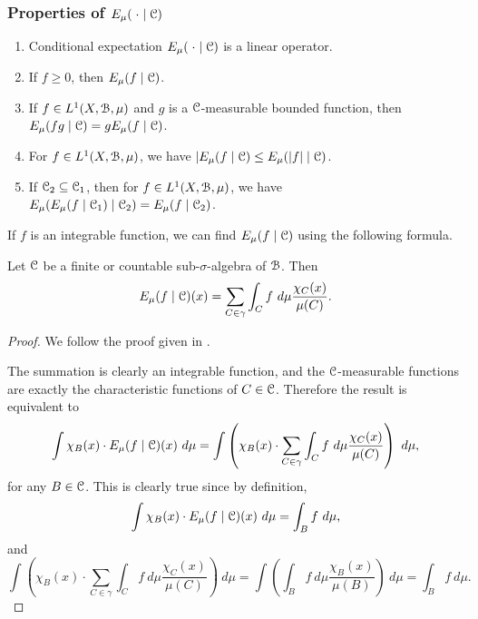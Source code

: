 \subsubsection{Properties of \texorpdfstring{$E_\mu(\mathrel{}\cdot\mathrel{} \mid \mathcal{C})$}{the conditional expectation operator}}
\begin{enumerate}
	\item Conditional expectation $E_\mu(\mathrel{}\cdot\mathrel{} \mid \mathcal{C})$ is a linear operator. \label{cond-exp:1}
	\item If $f \geq 0$, then $E_\mu(f \mid \mathcal{C})$. \label{cond-exp:2}
	\item If $f \in L^1(X, \mathcal{B}, \mu)$ and $g$ is a $\mathcal{C}$-measurable bounded function, then $E_\mu(fg \mid \mathcal{C}) = gE_\mu(f \mid \mathcal{C})$. \label{cond-exp:3}
	\item For $f \in L^1(X, \mathcal{B}, \mu)$, we have $|E_\mu(f \mid \mathcal{C}) \leq E_\mu(|f| \mid \mathcal{C})$. \label{cond-exp:4}
	\item If $\mathcal{C}_2 \subseteq \mathcal{C}_1$, then for $f \in L^1(X, \mathcal{B}, \mu)$, we have $E_\mu(E_\mu(f \mid \mathcal{C}_1) \mid \mathcal{C}_2) = E_\mu(f \mid \mathcal{C}_2)$. \label{cond-exp:5}
\end{enumerate}

If $f$ is an integrable function, we can find $E_\mu(f \mid \mathcal{C})$ using the following formula.

\begin{proposition}
	Let $\mathcal{C}$ be a finite or countable sub-$\sigma$-algebra of $\mathcal{B}$. Then
	\[
		E_\mu(f \mid \mathcal{C})(x) = \sum_{C \in \gamma}{\int_{C}{f\ d\mu}\frac{\chi_{C}(x)}{\mu(C)}}.
	\]
	
	\begin{proof}
		We follow the proof given in \cite[Example 10.1.2]{bogachev:measure}.
		
		The summation is clearly an integrable function, and the $\mathcal{C}$-measurable functions are exactly the characteristic functions of $C \in \mathcal{C}$. Therefore the result is equivalent to
		\[
			\int{\chi_B(x) \cdot E_\mu(f \mid \C)(x)\ d\mu} = \int{\left(\chi_B(x) \cdot \sum_{C \in \gamma}{\int_{C}{f\ d\mu}\frac{\chi_{C}(x)}{\mu(C)}}\right)\ d\mu},
		\]
		for any $B \in \mathcal{C}$. This is clearly true since by definition,
		\[
			\int{\chi_B(x) \cdot E_\mu(f \mid \mathcal{C})(x)\ d\mu} = \int_B{f\ d\mu},
		\]
		and
		\[
			\int{\left(\chi_B(x) \cdot \sum_{C \in \gamma}{\int_{C}{f\ d\mu}\frac{\chi_{C}(x)}{\mu(C)}}\right)\ d\mu} = \int{\left({\int_{B}{f\ d\mu}\frac{\chi_{B}(x)}{\mu(B)}}\right)\ d\mu} = \int_{B}{f\ d\mu}.
		\]
	\end{proof}
\end{proposition}

